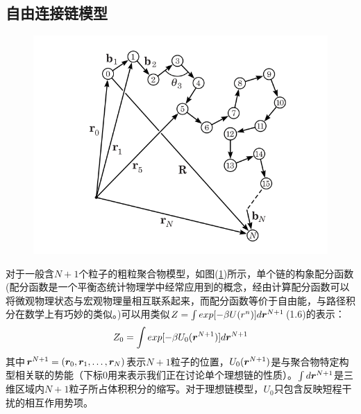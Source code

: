 \subsection{自由连接链模型}
\begin{figure}[H]
	\centering   
	\includegraphics[width=12cm]{./figures/2-1.png}
	\caption{ }
	\label{2.1}
\end{figure}

对于一般含$N+1$个粒子的粗粒聚合物模型，如图(\ref{2.1})所示，单个链的构象配分函数(配分函数是一个平衡态统计物理学中经常应用到的概念，经由计算配分函数可以将微观物理状态与宏观物理量相互联系起来，而配分函数等价于自由能，与路径积分在数学上有巧妙的类似。)可以用类似$Z=\int exp[-\beta U(r^{n})] d \bm{r}^{N+1}$(1.6)的表示：\\
\begin{gather}
Z_0 = \int exp[-\beta U_{0}({\bm{r}}^{N+1})] d \bm{r}^{N+1}
\label{2.3}
\end{gather}
其中$\bm{r}^{N+1}=(\bm{r}_0,\bm{r}_1,\ldots,\bm{r}_{N})$表示$N+1$粒子的位置，$U_0(\bm{r}^{N+1})$是与聚合物特定构型相关联的势能（下标$0$用来表示我们正在讨论单个理想链的性质）。$\int d\bm{r}^{N+1}$是三维区域内$N+1$粒子所占体积积分的缩写。对于理想链模型，$U_0$只包含反映短程干扰的相互作用势项。\\


